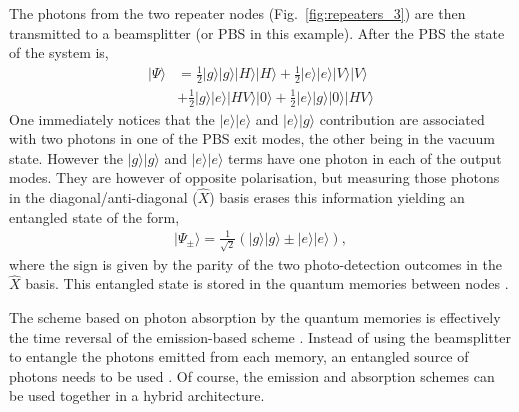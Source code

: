 \documentclass[twocolumn, aps, rmp, amsmath, amssymb, nofootinbib, superscriptaddress, longbibliography, floatfix, table-of-contents, eqsecnum]{revtex4-1}
\begin{document}
The photons from the two repeater nodes (Fig.~\ref{fig:repeaters_3}) are then transmitted to a beamsplitter (or PBS in this example). After the PBS the state of the system is,
\begin{align}
|\Psi\rangle &= \frac{1}{2} |g\rangle |g\rangle |H\rangle |H\rangle +\frac{1}{2} |e\rangle |e\rangle |V\rangle |V\rangle \nonumber \\
&+\frac{1}{2} |g\rangle |e\rangle |HV\rangle |0\rangle + \frac{1}{2} |e\rangle |g\rangle |0\rangle |HV\rangle 
\end{align}
One immediately notices that the $|e\rangle |e\rangle$ and  $|e\rangle |g\rangle$ contribution are associated with two photons in one of the PBS exit modes, the other being in the vacuum state. However the $|g\rangle |g\rangle$ and $|e\rangle |e\rangle$ terms have one photon in each of the output modes. They are however of opposite polarisation, but measuring those photons in the diagonal/anti-diagonal ($\hat{X}$) basis erases this information yielding an entangled state of the form,
\begin{align}
|\Psi_\pm\rangle=\frac{1}{\sqrt{2}} (|g\rangle |g\rangle \pm |e\rangle |e\rangle),
\end{align}
where the sign is given by the parity of the two photo-detection outcomes in the $\hat{X}$ basis. This entangled state is stored in the quantum memories between nodes \cite{}. 

The scheme based on photon absorption by the quantum memories is effectively the time reversal of the emission-based scheme \cite{}. Instead of using the beamsplitter to entangle the photons emitted from each memory, an entangled source of photons needs to be used \cite{}. Of course, the emission and absorption schemes can be used together in a hybrid architecture.
\end{document}
